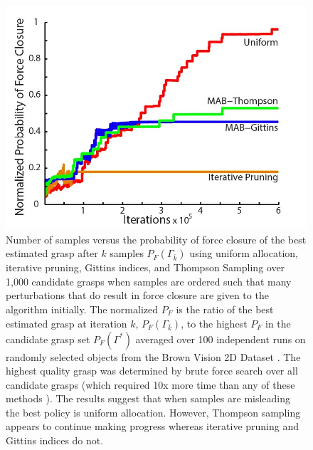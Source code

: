 \documentclass[10pt, conference]{ieeeconf}      %
\begin{document}
\begin{figure}[t!]
\centering
\includegraphics[scale=0.25]{matlab_figures/worst_case-02.jpg}
\caption{ \footnotesize 
	Number of samples versus the probability of force closure of the best estimated grasp after $k$ samples $P_F(\Gamma_{\bar{k}})$ using uniform allocation, iterative pruning, Gittins indices, and Thompson Sampling over 1,000 candidate grasps when samples are ordered such that many perturbations that do result in force closure are given to the algorithm initially.
	The normalized $P_F$ is the ratio of the best estimated grasp at iteration $k$, $P_F(\Gamma_{\bar{k}})$, to the highest $P_F$ in the candidate grasp set $P_F(\Gamma^*)$ averaged over 100 independent runs on randomly selected objects from the Brown Vision 2D Dataset \cite{brown}.
 	The highest quality grasp was determined by brute force search over all candidate grasps (which required 10x  more time than any of these methods \cite{kehoe2012toward}).
 	The results suggest that when samples are misleading the best policy is uniform allocation. 	However, Thompson sampling appears to continue making progress whereas iterative pruning and Gittins indices do not.}
\vspace*{-10pt}
\label{fig:worst_case}
\end{figure}
\end{document}
